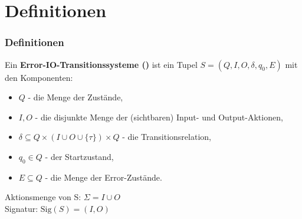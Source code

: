 \section{Definitionen}
\begin{frame}
  \frametitle{Definitionen}
  \begin{Def}
    Ein \textbf{Error-IO-Transitionssysteme (\EIO{})} ist ein Tupel $S=(Q,I,O,\delta
    ,q_0,E)$ mit den Komponenten:
    \begin{itemize}
      \item $Q$ - die Menge der Zustände,
      \item $I,O$ - die disjunkte Menge der (sichtbaren) Input- und
        Output-Aktionen,
      \item $\delta\subseteq Q\times (I\cup O\cup \{\tau\})\times Q$ - die
        Transitionsrelation,
      \item $q_0\in Q$ - der Startzustand,
      \item $E\subseteq Q$ - die Menge der Error-Zustände.
    \end{itemize}
  \end{Def}
  Aktionsmenge von S: $\Sigma = I\cup O$\\
  Signatur: $\mathrm{Sig}(S)= (I,O)$
\end{frame}

